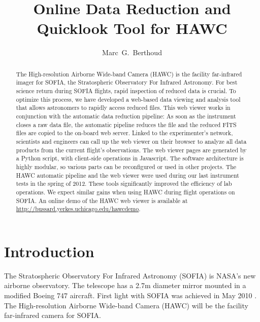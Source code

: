 
\resetcounters




\title{Online Data Reduction and Quicklook Tool for HAWC}
\author{Marc~G.~Berthoud
}


\begin{abstract}
The High-resolution Airborne Wide-band Camera (HAWC) is the facility
far-infrared imager for SOFIA, the Stratospheric Observatory For
Infrared Astronomy.  For best science return during SOFIA flights,
rapid inspection of reduced data is crucial. To optimize this process,
we have developed a web-based data viewing and analysis tool that
allows astronomers to rapidly access reduced files.  This web viewer
works in conjunction with the automatic data reduction pipeline: As
soon as the instrument closes a raw data file, the automatic pipeline
reduces the file and the reduced FITS files are copied to the on-board
web server. Linked to the experimenter's network, scientists and
engineers can call up the web viewer on their browser to analyze all
data products from the current flight's observations.  The web viewer
pages are generated by a Python script, with client-side operations in
Javascript. The software architecture is highly modular, so various
parts can be reconfigured or used in other projects.  The HAWC
automatic pipeline and the web viewer were used during our last
instrument tests in the spring of 2012. These tools significantly
improved the efficiency of lab operations. We expect similar gains
when using HAWC during flight operations on SOFIA. An online demo of
the HAWC web viewer is available at
\url{http://bussard.yerkes.uchicago.edu/hawcdemo}.\end{abstract}

\section{Introduction}

The Stratospheric Observatory For Infrared Astronomy (SOFIA) is NASA's
new airborne observatory. The telescope has a 2.7m diameter mirror
mounted in a modified Boeing 747 aircraft. First light with SOFIA was
achieved in May 2010 \citep{herter12}. The High-resolution Airborne
Wide-band Camera (HAWC) will be the facility far-infrared camera for
SOFIA.

